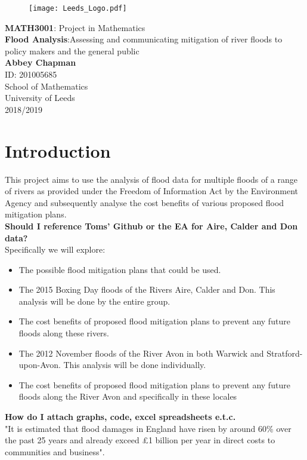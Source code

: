 \documentclass[11 pt, a4paper]{article}
\begin{document}
\begin{titlepage}
\begin{center}

\begin{figure}[h!]
\centering
\texttt{[image: Leeds\_Logo.pdf]}
\end{figure}

\vspace{4cm}
{\LARGE \textbf{MATH3001}: Project in Mathematics}\\

\vspace{1cm}
{\Huge \textbf{Flood Analysis}:Assessing and communicating mitigation of river floods to policy makers and the general public}\\
\vspace{5cm}
\textbf{Abbey Chapman}\\
ID: 201005685\\
\vfill
School of Mathematics\\
University of Leeds\\
2018/2019
\end{center}
\end{titlepage}

\tableofcontents 
\noindent \hrulefill

\newpage
\section{Introduction}
This project aims to use the analysis of flood data for multiple floods of a range of rivers as provided under the Freedom of Information Act by the Environment Agency and subsequently analyse the cost benefits of various proposed flood mitigation plans. \\
\textbf{Should I reference Toms' Github or the EA for Aire, Calder and Don data?}\\
Specifically we will explore:\\

\begin{framed}
\begin{itemize}
\item The possible flood mitigation plans that could be used.
\item The 2015 Boxing Day floods of the Rivers Aire, Calder and Don. This analysis will be done by the entire group.
\item The cost benefits of proposed flood mitigation plans to prevent any future floods along these rivers.
\item The 2012 November floods of the River Avon in both Warwick and Stratford-upon-Avon. This analysis will be done individually.
\item The cost benefits of proposed flood mitigation plans to prevent any future floods along the River Avon and specifically in these locales
\end{itemize}
\end{framed}
\textbf{How do I attach graphs, code, excel spreadsheets e.t.c.}\\
"It is estimated that flood damages in England have risen by around 60\% over the past 25 years and already exceed £1 billion per year in direct costs to communities and business".\cite{2}
\end{document}

